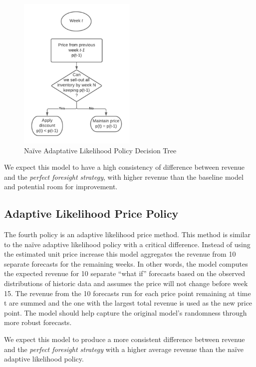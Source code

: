 \documentclass[11pt,a4paper]{article}
\begin{document}
\begin{figure}[h]
    \centering
    \includegraphics[width=0.5\textwidth]{pic/f3.png}
    \caption{Naïve Adaptative Likelihood Policy Decision Tree}
\end{figure}

\hfill \break
\indent We expect this model to have a high consistency of difference between revenue and the \emph{perfect foresight strategy}, with higher revenue than the baseline model and potential room for improvement.

\subsection{Adaptive Likelihood Price Policy}
The fourth policy is an adaptive likelihood price method. 
This method is similar to the naïve adaptive likelihood policy with a critical difference. 
Instead of using the estimated unit price increase this model aggregates the revenue from 10 separate forecasts for the remaining weeks. 
In other words, the model computes the expected revenue for 10 separate “what if” forecasts based on the observed distributions of historic data and assumes the price will not change before week 15.  
The revenue from the 10 forecasts run for each price point remaining at time t are summed and the one with the largest total revenue is used as the new price point. 
The model should help capture the original model’s randomness through more robust forecasts.

We expect this model to produce a more consistent difference between revenue and the \emph{perfect foresight strategy} with a higher average revenue than the naïve adaptive likelihood policy.
\end{document}
